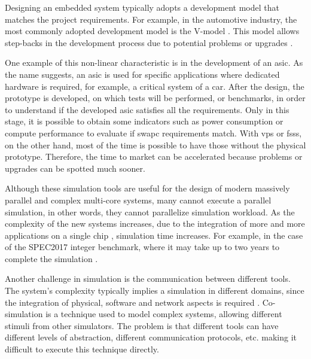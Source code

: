 


Designing an embedded system typically adopts a development model that matches the project requirements. 
For example, in the automotive industry, the most commonly adopted development model is the V-model \cite{liu2016incremental}. This model 
allows step-backs in the development process due to potential problems or upgrades \cite{ProductDesignSteps}. 

One example of this non-linear characteristic is in the development of an \gls{asic}. As the name suggests, an \gls{asic} is used for specific 
applications where dedicated hardware is required, for example, a critical system of a car. After the design, the prototype is developed, on 
which tests will be performed, or benchmarks, in order to understand if the developed \gls{asic} satisfies all the requirements. Only in this stage, 
it is possible to obtain some indicators such as power consumption or compute performance to evaluate if \gls{swapc} requirements match. 
With \glspl{vp} or \glspl{fss}, on the other hand, most of the time is possible to have those without the physical prototype. 
Therefore, the time to market can be accelerated because problems or upgrades can be spotted much sooner.

Although these simulation tools are useful for the design of modern massively parallel and complex multi-core systems, 
many cannot execute a parallel simulation, in other words, they cannot parallelize simulation workload. 
As the complexity of the new systems increases, due to the integration of more and more applications on a single chip 
\cite{terascaleComputing}, simulation time increases.
For example, in the case of the SPEC2017 integer benchmark, where it may 
take up to two years to complete the simulation \cite{pargem5}. 

Another challenge in simulation is the communication between different tools. The system's complexity typically implies a simulation in 
different domains, since the integration of physical, software and network aspects is required \cite{gomes2017co}. Co-simulation is a technique 
used to model complex systems, allowing different stimuli from other simulators. The problem is that different tools can have different levels 
of abstraction, different communication protocols, etc. making it difficult to execute this technique directly. 


